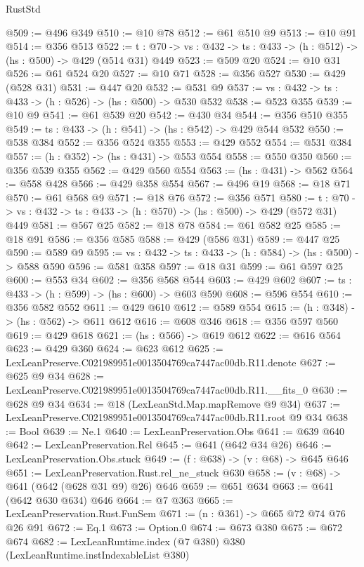 \begin{lexlean}{RustStd}
\begin{coremodule}
@509 := @496 @349
@510 := @10 @78
@512 := @61 @510 @9
@513 := @10 @91
@514 := @356 @513
@522 := {t : @70} -> {vs : @432} -> {ts : @433} -> (h : @512) -> (hs : @500) -> @429 (@514 @31) @449
@523 := @509 @20
@524 := @10 @31
@526 := @61 @524 @20
@527 := @10 @71
@528 := @356 @527
@530 := @429 (@528 @31)
@531 := @447 @20
@532 := @531 @9
@537 := {vs : @432} -> {ts : @433} -> (h : @526) -> (hs : @500) -> @530 @532
@538 := @523 @355
@539 := @10 @9
@541 := @61 @539 @20
@542 := @430 @34
@544 := @356 @510 @355
@549 := {ts : @433} -> (h : @541) -> (hs : @542) -> @429 @544 @532
@550 := @538 @384
@552 := @356 @524 @355
@553 := @429 @552
@554 := @531 @384
@557 := (h : @352) -> (hs : @431) -> @553 @554
@558 := @550 @350
@560 := @356 @539 @355
@562 := @429 @560 @554
@563 := (hs : @431) -> @562
@564 := @558 @428
@566 := @429 @358 @554
@567 := @496 @19
@568 := @18 @71
@570 := @61 @568 @9
@571 := @18 @76
@572 := @356 @571
@580 := {t : @70} -> {vs : @432} -> {ts : @433} -> (h : @570) -> (hs : @500) -> @429 (@572 @31) @449
@581 := @567 @25
@582 := @18 @78
@584 := @61 @582 @25
@585 := @18 @91
@586 := @356 @585
@588 := @429 (@586 @31)
@589 := @447 @25
@590 := @589 @9
@595 := {vs : @432} -> {ts : @433} -> (h : @584) -> (hs : @500) -> @588 @590
@596 := @581 @358
@597 := @18 @31
@599 := @61 @597 @25
@600 := @553 @34
@602 := @356 @568 @544
@603 := @429 @602
@607 := {ts : @433} -> (h : @599) -> (hs : @600) -> @603 @590
@608 := @596 @554
@610 := @356 @582 @552
@611 := @429 @610
@612 := @589 @554
@615 := (h : @348) -> (hs : @562) -> @611 @612
@616 := @608 @346
@618 := @356 @597 @560
@619 := @429 @618
@621 := (hs : @566) -> @619 @612
@622 := @616 @564
@623 := @429 @360
@624 := @623 @612
@625 := LexLeanPreserve.C021989951e0013504769ca7447ac00db.R11.denote
@627 := @625 @9 @34
@628 := LexLeanPreserve.C021989951e0013504769ca7447ac00db.R11.__fits_0
@630 := @628 @9 @34
@634 := @18 (LexLeanStd.Map.mapRemove @9 @34)
@637 := LexLeanPreserve.C021989951e0013504769ca7447ac00db.R11.root @9 @34
@638 := Bool
@639 := Ne.{1}
@640 := LexLeanPreservation.Obs
@641 := @639 @640
@642 := LexLeanPreservation.Rel
@645 := @641 (@642 @34 @26)
@646 := LexLeanPreservation.Obs.stuck
@649 := (f : @638) -> (v : @68) -> @645 @646
@651 := LexLeanPreservation.Rust.rel_ne_stuck @630
@658 := (v : @68) -> @641 (@642 (@628 @31 @9) @26) @646
@659 := @651 @634
@663 := @641 (@642 @630 @634) @646
@664 := @7 @363
@665 := LexLeanPreservation.Rust.FunSem
@671 := (n : @361) -> @665 @72 @74 @76 @26 @91
@672 := Eq.{1}
@673 := Option.{0}
@674 := @673 @380
@675 := @672 @674
@682 := LexLeanRuntime.index (@7 @380) @380 (LexLeanRuntime.instIndexableList @380)

\end{coremodule}
\end{lexlean}
